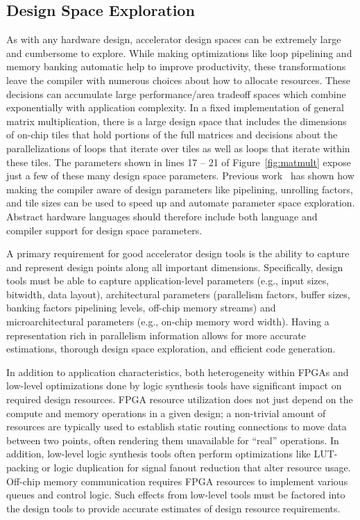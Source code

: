 \subsection{Design Space Exploration}
As with any hardware design, accelerator design spaces can be extremely large and cumbersome to explore.
While making optimizations like loop pipelining and memory banking automatic help to improve productivity, these transformations leave the compiler with numerous choices about how to allocate resources.
These decisions can accumulate large performance/area tradeoff spaces which combine exponentially with application complexity. In a fixed implementation
of general matrix multiplication, there is a large design space that includes the dimensions of on-chip tiles that hold portions of the full matrices and decisions
about the parallelizations of loops that iterate over tiles as well as loops that iterate within these tiles.  The parameters shown in lines 17 -- 21 of Figure~\ref{fig:matmult} expose just a few of these many design space parameters.
Previous work~\cite{dhdl} has shown how making the compiler aware of design parameters like pipelining, unrolling factors, and tile sizes can be used to speed up and automate parameter space exploration. Abstract hardware languages should therefore include both language and compiler support for design space parameters.


A primary requirement for good accelerator design tools is the ability
to capture and represent design points along all important dimensions.
Specifically, design tools must be able to capture
application-level parameters (e.g., input sizes, bitwidth, data layout),
architectural parameters (parallelism factors, buffer sizes, banking factors
pipelining levels, off-chip memory streams) and microarchitectural parameters
(e.g., on-chip memory word width). Having a representation rich in parallelism
information allows for more accurate estimations, thorough design space
exploration, and efficient code generation.

In addition to application characteristics, both heterogeneity within FPGAs
and low-level optimizations done by logic synthesis tools have
significant impact on required design resources. FPGA resource
utilization does not just depend on the compute and
memory operations in a given design; a non-trivial amount of resources are typically used
to establish static routing connections to move data between two points, often rendering them unavailable
for ``real'' operations. In addition, low-level
logic synthesis tools often perform optimizations like LUT-packing or logic duplication for signal fanout
reduction that alter resource usage. Off-chip memory communication requires FPGA
resources to implement various queues and control logic. Such effects from low-level tools
must be factored into the design tools to provide accurate estimates of design resource requirements.

